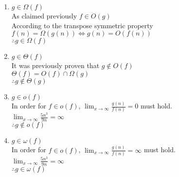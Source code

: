 \documentclass[11pt]{article}
\begin{document}
\begin{enumerate}
			\item $g \in \Omega(f)$ \\
				As claimed previously $ f \in O(g)$ \\ 
				According to the transpose symmetric property $f(n) = \Omega (g(n)) \Leftrightarrow g(n) = O(f(n)) $ \\
				$\therefore g \in \Omega (f)$
			
			\item $g \in \Theta(f)$ \\
				It was previously proven that $g \notin O(f)$ \\
				$\Theta(f) = O(f) \cap \Omega(g)$\\
				$\therefore g \notin \Theta (g)$
				
			\item $g \in o(f)$ \\
				In order for $f \in o(f)$, $\lim_{x \to \infty} \frac{g(n)}{f(n)} = 0$	must hold. \\
				$\lim_{x \to \infty} \frac{5n^3}{9n} = \infty $\\
				$\therefore g \notin o(f)$
				
			\item $g \in \omega(f)$ \\
				In order for $f \in o(f)$, $\lim_{x \to \infty} \frac{g(n)}{f(n)} = \infty$	must hold. \\
				$\lim_{x \to \infty} \frac{5n^3}{9n} = \infty $\\
				$\therefore g \in \omega(f)$
		\end{enumerate}
		
		
\end{document}
